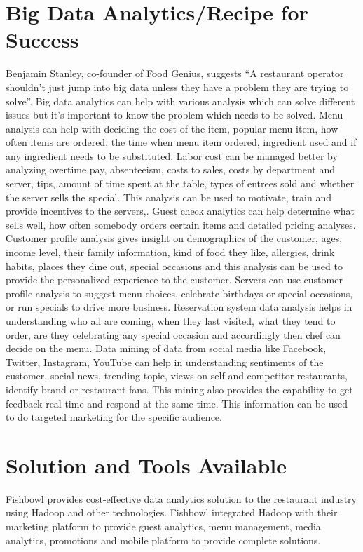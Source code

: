 \documentclass[sigconf]{acmart}
\begin{document}
\section{Big Data Analytics/Recipe for Success}
Benjamin Stanley, co-founder of Food Genius, suggests ``A restaurant operator shouldn't just jump into big data unless they have a problem they are trying to solve''\cite{KooserAmandaC.2013BD}. Big data analytics can help with various analysis which can solve different issues but it's important to know the problem which needs to be solved. Menu analysis can help with deciding the cost of the item, popular menu item, how often items are ordered, the time when menu item ordered, ingredient used and if any ingredient needs to be substituted\cite{KooserAmandaC.2013BD}. Labor cost can be managed better by analyzing overtime pay, absenteeism, costs to sales, costs by department and server, tips, amount of time spent at the table, types of entrees sold and whether the server sells the special. This analysis can be used to motivate, train and provide incentives to the servers\cite{www-restaurant},\cite{KooserAmandaC.2013BD}. Guest check analytics can help determine what sells well, how often somebody orders certain items and detailed pricing analyses\cite{www-restaurant}. Customer profile analysis gives insight on demographics of the customer, ages, income level, their family information, kind of food they like, allergies, drink habits, places they dine out, special occasions and this analysis can be used to provide the personalized experience to the customer\cite{www-restaurant}. Servers can use customer profile analysis to suggest menu choices, celebrate birthdays or special occasions, or run specials to drive more business. Reservation system data analysis helps in understanding who all are coming, when they last visited, what they tend to order, are they celebrating any special occasion and accordingly then chef can decide on the menu\cite{www-bostonglobe}. Data mining of data from social media like Facebook, Twitter, Instagram, YouTube can help in understanding sentiments of the customer, social news, trending topic, views on self and competitor restaurants, identify brand or restaurant fans\cite{JENNINGSLISA2015Mbds}. This mining also provides the capability to get feedback real time and respond at the same time. This information can be used to do targeted marketing for the specific audience\cite{JENNINGSLISA2015Mbds}. 

\section{Solution and Tools Available}
Fishbowl provides cost-effective data analytics solution to the restaurant industry using Hadoop and other technologies. Fishbowl integrated Hadoop with their marketing platform to provide guest analytics, menu management, media analytics, promotions and mobile platform to provide complete solutions.\cite{www-foodnewsfeed}\cite{www-fishbowl}  
\end{document}
